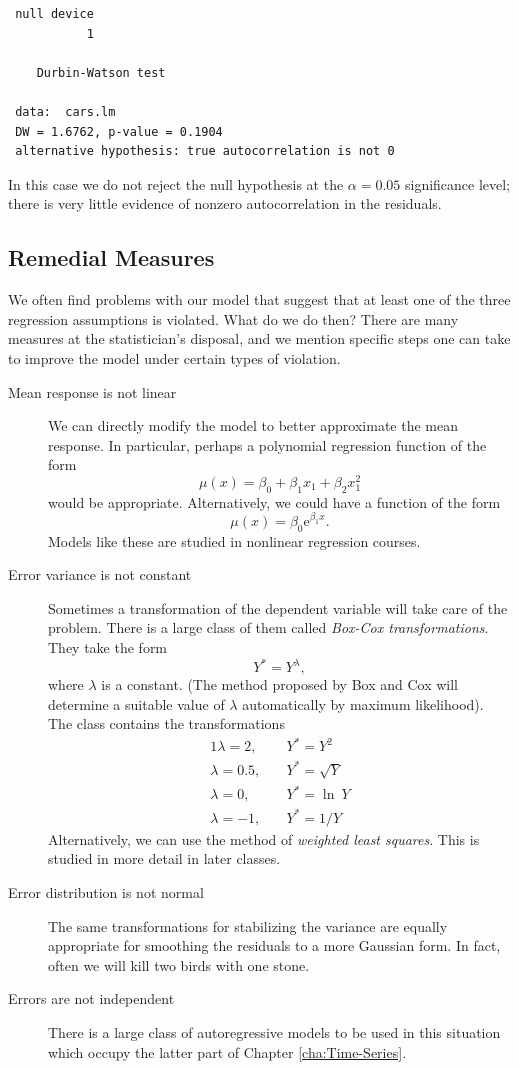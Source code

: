 \documentclass[captions=tableheading]{scrbook}
\begin{document}
\begin{verbatim}
 null device 
           1
  
 	Durbin-Watson test
 
 data:  cars.lm 
 DW = 1.6762, p-value = 0.1904
 alternative hypothesis: true autocorrelation is not 0
\end{verbatim}

In this case we do not reject the null hypothesis at the \(\alpha=0.05\) significance level; there is very little evidence of nonzero autocorrelation in the residuals.
\subsection{Remedial Measures}
\label{sec-11-4-4}


We often find problems with our model that suggest that at least one of the three regression assumptions is violated. What do we do then? There are many measures at the statistician's disposal, and we mention specific steps one can take to improve the model under certain types of violation.

\begin{description}
\item[Mean response is not linear] We can directly modify the model to better approximate the mean response. In particular, perhaps a polynomial regression function of the form 
  \[
  \mu(x) = \beta_{0} + \beta_{1}x_{1} + \beta_{2}x_{1}^{2}
  \]
  would be appropriate. Alternatively, we could have a function of the form
  \[
  \mu(x)=\beta_{0}\mathrm{e}^{\beta_{1}x}.
  \]
  Models like these are studied in nonlinear regression courses.
\item[Error variance is not constant] Sometimes a transformation of the dependent variable will take care of the problem. There is a large class of them called \emph{Box-Cox transformations}. They take the form 
  \begin{equation}
  Y^{\ast}=Y^{\lambda},
  \end{equation}
  where \(\lambda\) is a constant. (The method proposed by Box and Cox will determine a suitable value of \(\lambda\) automatically by maximum likelihood). The class contains the transformations 
  \begin{alignat*}{1}
  \lambda=2,\quad & Y^{\ast}=Y^{2}\\
  \lambda=0.5,\quad & Y^{\ast}=\sqrt{Y}\\
  \lambda=0,\quad & Y^{\ast}=\ln\: Y\\
  \lambda=-1,\quad & Y^{\ast}=1/Y
  \end{alignat*}
  Alternatively, we can use the method of \emph{weighted least squares}. This is studied in more detail in later classes.
\item[Error distribution is not normal] The same transformations for stabilizing the variance are equally appropriate for smoothing the residuals to a more Gaussian form. In fact, often we will kill two birds with one stone.
\item[Errors are not independent] There is a large class of autoregressive models to be used in this situation which occupy the latter part of Chapter \ref{cha:Time-Series}.
\end{description}
\end{document}
